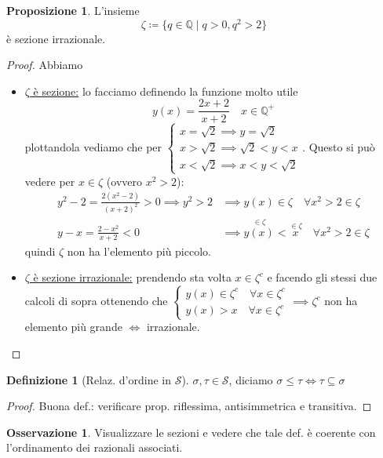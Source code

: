 \documentclass[a4paper,10pt]{article}
\theoremstyle{definition}
\newcommand{\qu}{\mathbb{Q}} %
\theoremstyle{indentdefinition}
\newtheorem{defn}{Definizione}[section]
\theoremstyle{indentpostulate}
\theoremstyle{indenttheorem}
\newtheorem{prop}{Proposizione}[section]
\theoremstyle{myremark}
\newtheorem*{rem*}{Osservazione}
\theoremstyle{indentgeneral}
\newenvironment{myboxed} 
{\noindent\begin{lrbox}{\mybox}\begin{minipage}{\textwidth}}
{\end{minipage}\end{lrbox}\fbox{\usebox{\mybox}}}
\begin{document}
\begin{myboxed}
\begin{prop}
    L'insieme 
    $$\zeta\coloneqq\{q\in\qu\mid q>0, q^2>2\}$$
    è sezione irrazionale.
\end{prop}
\end{myboxed}

\begin{proof}
    Abbiamo
    \begin{itemize}
        \item \underline{$\zeta$ è sezione:} lo facciamo definendo la funzione molto utile
        $$y(x)=\frac{2x+2}{x+2}\quad x\in\qu^+$$
        plottandola vediamo che per $\begin{cases}
            x=\sqrt{2}\implies y=\sqrt{2}\\
            x>\sqrt{2}\implies \sqrt{2}<y<x\\
            x<\sqrt{2}\implies x<y<\sqrt{2}
        \end{cases}$. Questo si può vedere per $x\in\zeta$ (ovvero $x^2>2$):
        \begin{align*}
            y^2-2=\frac{2(x^2-2)}{(x+2)^2}>0\implies y^2>2 &\implies y(x)\in \zeta \quad \forall x^2>2\in \zeta\\
            y-x=\frac{2-x^2}{x+2}< 0&\implies \overset{\in \zeta}{y(x)}<\overset{\in\zeta}{x}\quad \forall x^2>2\in \zeta
        \end{align*}
        quindi $\zeta$ non ha l'elemento più piccolo.
        \item \underline{$\zeta$ è sezione irrazionale:} prendendo sta volta $x\in \zeta^c$ e facendo gli stessi due calcoli di sopra ottenendo che $\begin{cases}
            y(x)\in \zeta^c \quad \forall x\in \zeta^c \\
            y(x)> x\quad  \forall x\in \zeta^c
        \end{cases}\implies \zeta^c$ non ha elemento più grande $\iff$ irrazionale.
    \end{itemize}
\end{proof}

\begin{defn}[Relaz. d'ordine in $\mathscr{S}$] $\sigma,\tau\in\mathscr{S}$, diciamo $\sigma \le \tau \iff \tau\subseteq \sigma$
\end{defn}
\begin{proof}
    Buona def.: verificare prop. riflessima, antisimmetrica e transitiva.
\end{proof}
\begin{rem*}
    Visualizzare le sezioni e vedere che tale def. è coerente con l'ordinamento dei razionali associati.
\end{rem*}
\end{document}
